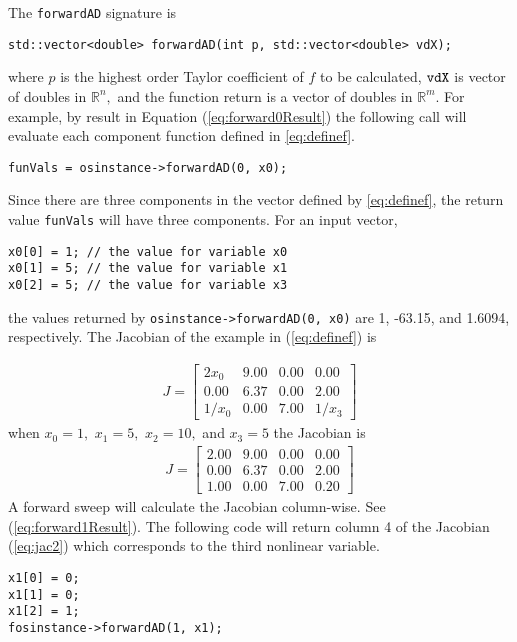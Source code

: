 \documentclass[11pt]{article}
\renewcommand{\_}{{\char"5F}}
\renewcommand{\{}{{\char"7B}}
\renewcommand{\}}{{\char"7D}}
\renewcommand{\^}{{\char"0D}}
\renewcommand{\'}{{\char"0D}}
\begin{document}
The {\tt forwardAD} signature is
\begin{verbatim}
std::vector<double> forwardAD(int p, std::vector<double> vdX);
\end{verbatim}
where $p$ is the highest order Taylor coefficient of $f$ to be calculated,  $\tt vdX$ is vector of doubles in $ \mathbb{R}^{n},$ and the function return is a vector of doubles in $ \mathbb{R}^{m}.$  For example, by result in Equation (\ref{eq:forward0Result}) the following call will evaluate each component function defined in \ref{eq:definef}.
\begin{verbatim}
funVals = osinstance->forwardAD(0, x0);
\end{verbatim}
Since there are three components in the vector defined by  \ref{eq:definef}, the return value  {\tt funVals} will have three components. For an input vector, 
\begin{verbatim}
x0[0] = 1; // the value for variable x0
x0[1] = 5; // the value for variable x1
x0[2] = 5; // the value for variable x3
\end{verbatim}
the values returned by {\tt osinstance->forwardAD(0, x0)}  are 1, -63.15, and 1.6094, respectively.
The Jacobian of the example in (\ref{eq:definef}) is

\begin{eqnarray}
J =
\left[
\begin{array}{rrrr}
2x_{0} &9.00&0.00&0.00   \\
0.00&6.37&0.00&2.00 \\
1/x_{0}&0.00&7.00&1/x_{3} 
\end{array}
\right] \label{eq:jac}
\end{eqnarray}
when $x_{0} = 1,$ $x_{1} = 5,$ $x_{2} = 10,$ and $x_{3} = 5$ the Jacobian is
\begin{eqnarray}
J =
\left[
\begin{array}{rrrr}
2.00 &9.00&0.00&0.00   \\
0.00&6.37&0.00&2.00 \\
1.00&0.00&7.00&0.20 
\end{array}
\right] \label{eq:jac2}
\end{eqnarray}
A forward sweep will calculate the Jacobian column-wise.  See 
(\ref{eq:forward1Result}).  The following code will return column 4 of the Jacobian (\ref{eq:jac2}) which corresponds to the third nonlinear variable. 
\begin{verbatim}
x1[0] = 0;
x1[1] = 0;
x1[2] = 1;
fosinstance->forwardAD(1, x1);
\end{verbatim}
\end{document}
